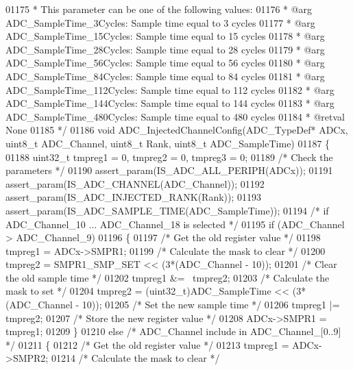 \begin{DoxyCode}
01175 \textcolor{comment}{  *          This parameter can be one of the following values:}
01176 \textcolor{comment}{  *            @arg ADC\_SampleTime\_3Cycles: Sample time equal to 3 cycles}
01177 \textcolor{comment}{  *            @arg ADC\_SampleTime\_15Cycles: Sample time equal to 15 cycles}
01178 \textcolor{comment}{  *            @arg ADC\_SampleTime\_28Cycles: Sample time equal to 28 cycles}
01179 \textcolor{comment}{  *            @arg ADC\_SampleTime\_56Cycles: Sample time equal to 56 cycles }
01180 \textcolor{comment}{  *            @arg ADC\_SampleTime\_84Cycles: Sample time equal to 84 cycles }
01181 \textcolor{comment}{  *            @arg ADC\_SampleTime\_112Cycles: Sample time equal to 112 cycles   }
01182 \textcolor{comment}{  *            @arg ADC\_SampleTime\_144Cycles: Sample time equal to 144 cycles   }
01183 \textcolor{comment}{  *            @arg ADC\_SampleTime\_480Cycles: Sample time equal to 480 cycles   }
01184 \textcolor{comment}{  * @retval None}
01185 \textcolor{comment}{  */}
01186 \textcolor{keywordtype}{void} ADC_InjectedChannelConfig(ADC\_TypeDef* ADCx, uint8\_t ADC\_Channel, uint8\_t Rank, uint8\_t 
      ADC\_SampleTime)
01187 \{
01188   uint32\_t tmpreg1 = 0, tmpreg2 = 0, tmpreg3 = 0;
01189   \textcolor{comment}{/* Check the parameters */}
01190   assert_param(IS\_ADC\_ALL\_PERIPH(ADCx));
01191   assert_param(IS\_ADC\_CHANNEL(ADC\_Channel));
01192   assert_param(IS\_ADC\_INJECTED\_RANK(Rank));
01193   assert_param(IS\_ADC\_SAMPLE\_TIME(ADC\_SampleTime));
01194   \textcolor{comment}{/* if ADC\_Channel\_10 ... ADC\_Channel\_18 is selected */}
01195   \textcolor{keywordflow}{if} (ADC\_Channel > ADC_Channel_9)
01196   \{
01197     \textcolor{comment}{/* Get the old register value */}
01198     tmpreg1 = ADCx->SMPR1;
01199     \textcolor{comment}{/* Calculate the mask to clear */}
01200     tmpreg2 = SMPR1_SMP_SET << (3*(ADC\_Channel - 10));
01201     \textcolor{comment}{/* Clear the old sample time */}
01202     tmpreg1 &= ~tmpreg2;
01203     \textcolor{comment}{/* Calculate the mask to set */}
01204     tmpreg2 = (uint32\_t)ADC\_SampleTime << (3*(ADC\_Channel - 10));
01205     \textcolor{comment}{/* Set the new sample time */}
01206     tmpreg1 |= tmpreg2;
01207     \textcolor{comment}{/* Store the new register value */}
01208     ADCx->SMPR1 = tmpreg1;
01209   \}
01210   \textcolor{keywordflow}{else} \textcolor{comment}{/* ADC\_Channel include in ADC\_Channel\_[0..9] */}
01211   \{
01212     \textcolor{comment}{/* Get the old register value */}
01213     tmpreg1 = ADCx->SMPR2;
01214     \textcolor{comment}{/* Calculate the mask to clear */}

\end{DoxyCode}
